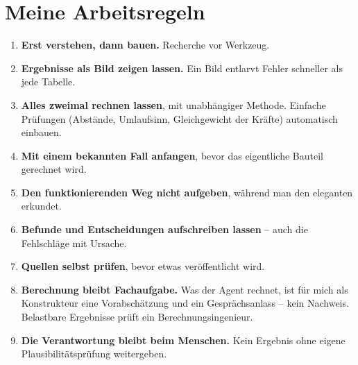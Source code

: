 \documentclass[10pt,a4paper]{article}
\begin{document}
\section{Meine Arbeitsregeln}
\begin{enumerate}[itemsep=1pt]
\item \textbf{Erst verstehen, dann bauen.} Recherche vor Werkzeug.
\item \textbf{Ergebnisse als Bild zeigen lassen.} Ein Bild entlarvt Fehler schneller als jede Tabelle.
\item \textbf{Alles zweimal rechnen lassen}, mit unabhängiger Methode. Einfache Prüfungen (Abstände, Umlaufsinn,
  Gleichgewicht der Kräfte) automatisch einbauen.
\item \textbf{Mit einem bekannten Fall anfangen}, bevor das eigentliche Bauteil gerechnet wird.
\item \textbf{Den funktionierenden Weg nicht aufgeben}, während man den eleganten erkundet.
\item \textbf{Befunde und Entscheidungen aufschreiben lassen} -- auch die Fehlschläge mit Ursache.
\item \textbf{Quellen selbst prüfen}, bevor etwas veröffentlicht wird.
\item \textbf{Berechnung bleibt Fachaufgabe.} Was der Agent rechnet, ist für mich als Konstrukteur eine
  Vorabschätzung und ein Gesprächsanlass -- kein Nachweis. Belastbare Ergebnisse prüft ein Berechnungsingenieur.
\item \textbf{Die Verantwortung bleibt beim Menschen.} Kein Ergebnis ohne eigene Plausibilitätsprüfung
  weitergeben.
\end{enumerate}

\end{document}
